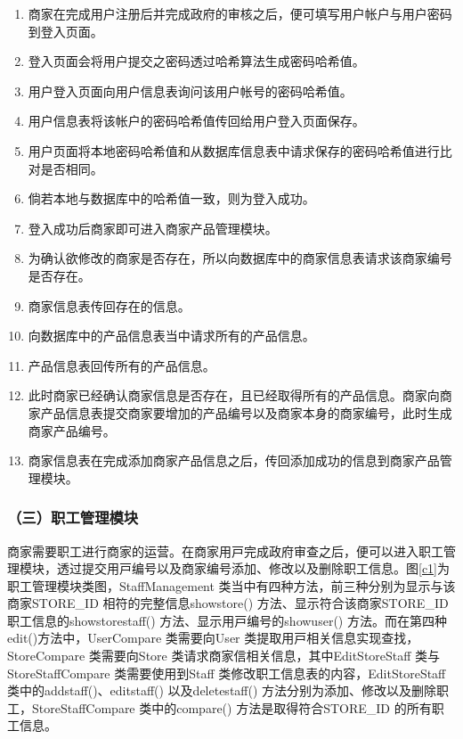 	\begin{enumerate}
	\item 商家在完成用户注册后并完成政府的审核之后，便可填写用户帐户与用户密码到登入页面。
	\item 登入页面会将用户提交之密码透过哈希算法生成密码哈希值。
	\item 用户登入页面向用户信息表询问该用户帐号的密码哈希值。
	\item 用户信息表将该帐户的密码哈希值传回给用户登入页面保存。
	\item 用户页面将本地密码哈希值和从数据库信息表中请求保存的密码哈希值进行比对是否相同。
	\item 倘若本地与数据库中的哈希值一致，则为登入成功。
	\item 登入成功后商家即可进入商家产品管理模块。
	\item 为确认欲修改的商家是否存在，所以向数据库中的商家信息表请求该商家编号是否存在。
	\item 商家信息表传回存在的信息。
	\item 向数据库中的产品信息表当中请求所有的产品信息。
	\item 产品信息表回传所有的产品信息。
	\item 此时商家已经确认商家信息是否存在，且已经取得所有的产品信息。商家向商家产品信息表提交商家要增加的产品编号以及商家本身的商家编号，此时生成商家产品编号。
	\item 商家信息表在完成添加商家产品信息之后，传回添加成功的信息到商家产品管理模块。
	\end{enumerate}


\subsubsection{（三）职工管理模块}
商家需要职⼯进⾏商家的运营。在商家⽤⼾完成政府审查之后，便可以进⼊职⼯管理模块，透过提交⽤⼾编号以及商家编号添加、修改以及删除职⼯信息。图\ref{c1}为职⼯管理模块类图，StaffManagement 类当中有四种⽅法，前三种分别为显⽰与该商家STORE\_ID 相符的完整信息showstore() ⽅法、显⽰符合该商家STORE\_ID 职⼯信息的showstorestaff() ⽅法、显⽰⽤⼾编号的showuser() ⽅法。而在第四种edit()方法中，UserCompare 类需要向User 类提取⽤⼾相关信息实现查找，StoreCompare 类需要向Store 类请求商家信相关信息，其中EditStoreStaff 类与StoreStaffCompare 类需要使⽤到Staff 类修改职⼯信息表的内容，EditStoreStaff 类中的addstaff()、editstaff() 以及deletestaff() ⽅法分别为添加、修改以及删除职⼯，StoreStaffCompare 类中的compare() ⽅法是取得符合STORE\_ID 的所有职⼯信息。

